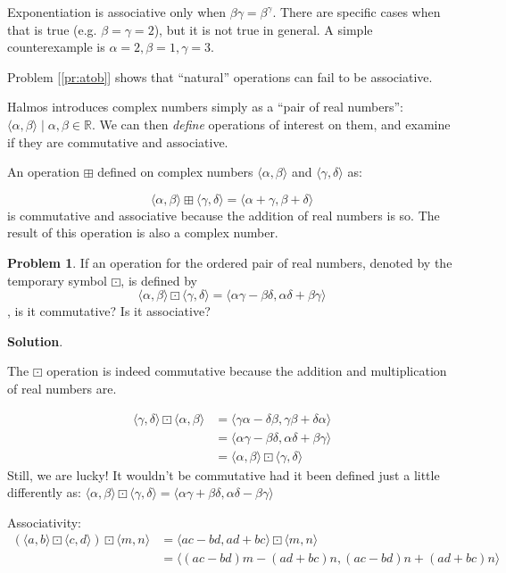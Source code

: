 \documentclass[english,notitlepage,smartquotes]{hgbreport}
\theoremstyle{definition}
\theoremstyle{problem}
\newtheorem{problem}{Problem}
\theoremstyle{remark}
\theoremstyle{plain}
\begin{document}
Exponentiation is associative only when $\beta\gamma=\beta^\gamma$. There are specific cases when that is true (e.g. $\beta=\gamma=2$), but it is not true in general. A simple counterexample is $\alpha=2,\beta=1,\gamma=3$.


Problem [\ref{pr:atob}] shows that ``natural'' operations can fail to be associative.

Halmos introduces complex numbers simply as a ``pair of real numbers'':$\langle\alpha,\beta\rangle\mid\alpha,\beta\in\mathbb{R}$. We can then \textit{define} operations of interest on them, and examine if they are commutative and associative.

An operation $\boxplus$ defined on complex numbers $\langle\alpha,\beta\rangle$ and $\langle\gamma,\delta\rangle$ as:

$$
\langle\alpha,\beta\rangle\boxplus\langle\gamma,\delta\rangle=\langle\alpha+\gamma,\beta+\delta\rangle
$$
is commutative and associative because the addition of real numbers is so. The result of this operation is also a complex number.


\begin{problem}
\label{pr:complexmult}
If an operation for the ordered pair of real numbers, denoted by the temporary symbol $\boxdot$, is defined by
$$
\langle\alpha,\beta\rangle\boxdot\langle\gamma,\delta\rangle=\langle\alpha\gamma-\beta\delta,\alpha\delta+\beta\gamma\rangle
$$
, is it commutative? Is it associative?
\end{problem}
\textbf{Solution}.

The $\boxdot$ operation is indeed commutative because the addition and multiplication of real numbers are.

\begin{align*}
\langle\gamma,\delta\rangle\boxdot\langle\alpha,\beta\rangle
&=
\langle\gamma\alpha-\delta\beta,\gamma\beta+\delta\alpha\rangle \\
&=\langle\alpha\gamma-\beta\delta,\alpha\delta+\beta\gamma\rangle\\
&=\langle\alpha,\beta\rangle\boxdot\langle\gamma,\delta\rangle
\end{align*}
Still, we are lucky! It wouldn't be commutative had it been defined just a little differently as:
$\langle\alpha,\beta\rangle\boxdot\langle\gamma,\delta\rangle=\langle\alpha\gamma+\beta\delta,\alpha\delta-\beta\gamma\rangle$

Associativity:
\begin{align*}
(\langle a, b\rangle\boxdot\langle c, d\rangle)\boxdot\langle m, n\rangle
&=
\langle a c- b d, a d+ b c\rangle\boxdot\langle m, n\rangle\\
&=\langle(ac-bd)m-(ad+bc)n,(ac-bd)n+(ad+bc)n\rangle
\end{align*}


\MakeBibliography[nosplit]

\end{document}
